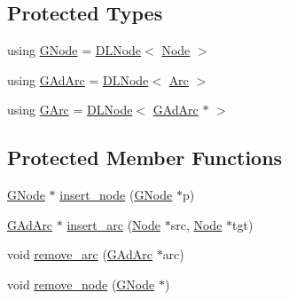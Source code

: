 \subsection*{Protected Types}
\begin{DoxyCompactItemize}
\item 
using \hyperlink{class_designar_1_1_digraph_a33b0d2b8820ada501522b0e67e63524a}{G\+Node} = \hyperlink{class_designar_1_1_d_l_node}{D\+L\+Node}$<$ \hyperlink{class_designar_1_1_digraph_a4dc921c41a480b7946a04170e997d8ae}{Node} $>$
\item 
using \hyperlink{class_designar_1_1_digraph_a0c6d846f23d1e82556fb6055557df53f}{G\+Ad\+Arc} = \hyperlink{class_designar_1_1_d_l_node}{D\+L\+Node}$<$ \hyperlink{class_designar_1_1_digraph_a0ceb278671f2a535c00fddccdeafd69f}{Arc} $>$
\item 
using \hyperlink{class_designar_1_1_digraph_a341acf8fb0195a8986158c29c4db1a89}{G\+Arc} = \hyperlink{class_designar_1_1_d_l_node}{D\+L\+Node}$<$ \hyperlink{class_designar_1_1_digraph_a0c6d846f23d1e82556fb6055557df53f}{G\+Ad\+Arc} $\ast$ $>$
\end{DoxyCompactItemize}
\subsection*{Protected Member Functions}
\begin{DoxyCompactItemize}
\item 
\hyperlink{class_designar_1_1_digraph_a33b0d2b8820ada501522b0e67e63524a}{G\+Node} $\ast$ \hyperlink{class_designar_1_1_digraph_a420fea8c892f9ce87a50489b97755026}{insert\+\_\+node} (\hyperlink{class_designar_1_1_digraph_a33b0d2b8820ada501522b0e67e63524a}{G\+Node} $\ast$p)
\item 
\hyperlink{class_designar_1_1_digraph_a0c6d846f23d1e82556fb6055557df53f}{G\+Ad\+Arc} $\ast$ \hyperlink{class_designar_1_1_digraph_a9180c479d24dc8dc648a37451c90d066}{insert\+\_\+arc} (\hyperlink{class_designar_1_1_digraph_a4dc921c41a480b7946a04170e997d8ae}{Node} $\ast$src, \hyperlink{class_designar_1_1_digraph_a4dc921c41a480b7946a04170e997d8ae}{Node} $\ast$tgt)
\item 
void \hyperlink{class_designar_1_1_digraph_abb7e909c1c44cd4cee2e742cb2d3fa17}{remove\+\_\+arc} (\hyperlink{class_designar_1_1_digraph_a0c6d846f23d1e82556fb6055557df53f}{G\+Ad\+Arc} $\ast$arc)
\item 
void \hyperlink{class_designar_1_1_digraph_a4a19c6f9333604d3d49992eeb5a6eeae}{remove\+\_\+node} (\hyperlink{class_designar_1_1_digraph_a33b0d2b8820ada501522b0e67e63524a}{G\+Node} $\ast$)
\end{DoxyCompactItemize}
